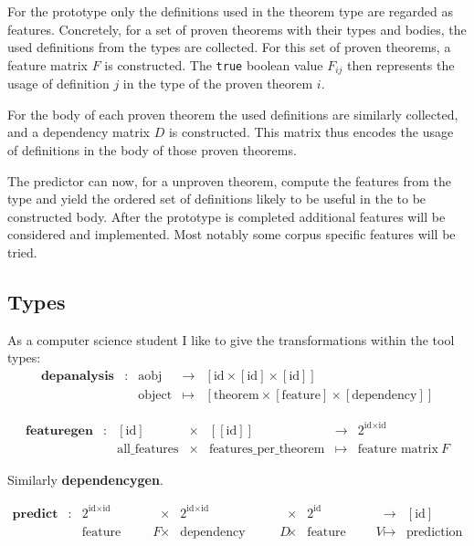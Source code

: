 For the prototype only the definitions used in the theorem type are regarded as features.
Concretely, for a set of proven theorems with their types and bodies, the used definitions from the types are collected.
For this set of proven theorems, a feature matrix $F$ is constructed.
The \texttt{true} boolean value $F_{ij}$ then represents the usage of definition $j$ in the type of the proven theorem $i$.

For the body of each proven theorem the used definitions are similarly collected, and a dependency matrix $D$ is constructed.
This matrix thus encodes the usage of definitions in the body of those proven theorems.

The predictor can now, for a unproven theorem, compute the features from the type and yield the ordered set of definitions likely to be useful in the to be constructed body.
After the prototype is completed additional features will be considered and implemented.
Most notably some corpus specific features will be tried.

\subsection{Types}
As a computer science student I like to give the transformations within the tool types:
\[
	\begin{array}{lclcl}
		\mathbf{depanalysis} & : & \text{aobj} & \longrightarrow & [\text{id} \times [\text{id}] \times [\text{id}]] \\
			& & \text{object} & \longmapsto & [\text{theorem} \times [\text{feature}] \times [\text{dependency}]]
	\end{array}
\]


\[
	\begin{array}{lclclcl}
		\mathbf{featuregen} & : & [\text{id}] & \times & [[\text{id}]] & \longrightarrow & 2^{\text{id} \times \text{id}} \\
			& & \text{all\_features} & \times & \text{features\_per\_theorem} & \longmapsto & \text{feature matrix}~F
	\end{array}
\]

Similarly \textbf{dependencygen}.

\[
	\begin{array}{lclclclcl}
		\mathbf{predict} & : & 2^{\text{id} \times \text{id}} & \times & 2^{\text{id} \times \text{id}} & \times & 2^{\text{id}} & \longrightarrow & [\text{id}] \\
			 & & \text{feature matrix}~F & \times & \text{dependency matrix}~D & \times & \text{feature vector}~V & \longmapsto & \text{prediction}
	\end{array}
\]

